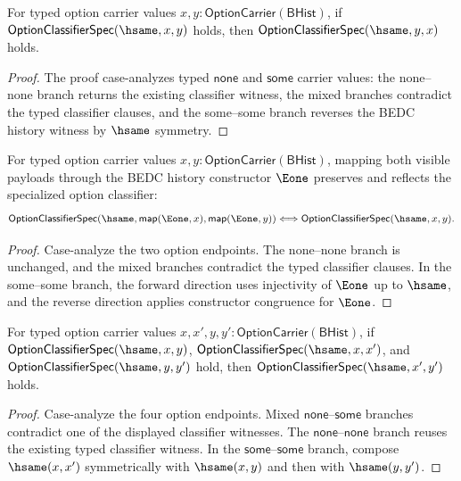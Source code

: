 \begin{theorem}
\label{thm:option-classifier-hsame-symm}
For typed option carrier values $x,y:\mathsf{OptionCarrier}(\mathsf{BHist})$, if $\mathsf{OptionClassifierSpec}(\hsame,x,y)$ holds, then $\mathsf{OptionClassifierSpec}(\hsame,y,x)$ holds.
\end{theorem}
\begin{proof}
The proof case-analyzes typed $\mathsf{none}$ and $\mathsf{some}$ carrier values: the none--none branch returns the existing classifier witness, the mixed branches contradict the typed classifier clauses, and the some--some branch reverses the BEDC history witness by $\hsame$ symmetry.
\end{proof}

\begin{theorem}
\label{thm:option-classifier-spec-hsame-e1-map-iff}
For typed option carrier values $x,y:\mathsf{OptionCarrier}(\mathsf{BHist})$,
mapping both visible payloads through the BEDC history constructor $\Eone$
preserves and reflects the specialized option classifier:
$$
\mathsf{OptionClassifierSpec}(\hsame,\mathsf{map}(\Eone,x),\mathsf{map}(\Eone,y))
\Longleftrightarrow
\mathsf{OptionClassifierSpec}(\hsame,x,y).
$$
\end{theorem}
\begin{proof}
Case-analyze the two option endpoints. The none--none branch is unchanged, and
the mixed branches contradict the typed classifier clauses. In the
some--some branch, the forward direction uses injectivity of $\Eone$ up to
$\hsame$, and the reverse direction applies constructor congruence for
$\Eone$.
\end{proof}

\begin{theorem}
\label{thm:option-classifier-spec-hsame-transport}
For typed option carrier values
$x,x',y,y':\mathsf{OptionCarrier}(\mathsf{BHist})$, if
$\mathsf{OptionClassifierSpec}(\hsame,x,y)$,
$\mathsf{OptionClassifierSpec}(\hsame,x,x')$, and
$\mathsf{OptionClassifierSpec}(\hsame,y,y')$ hold, then
$\mathsf{OptionClassifierSpec}(\hsame,x',y')$ holds.
\end{theorem}
\begin{proof}
Case-analyze the four option endpoints. Mixed $\mathsf{none}$--$\mathsf{some}$
branches contradict one of the displayed classifier witnesses. The
$\mathsf{none}$--$\mathsf{none}$ branch reuses the existing typed classifier
witness. In the $\mathsf{some}$--$\mathsf{some}$ branch, compose
$\hsame(x,x')$ symmetrically with $\hsame(x,y)$ and then with $\hsame(y,y')$.
\end{proof}

